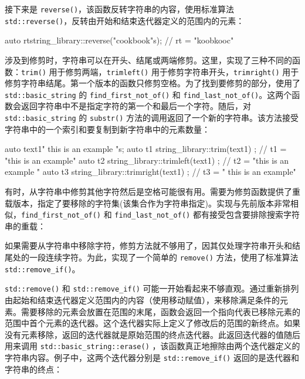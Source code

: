 接下来是 \verb|reverse()|，该函数反转字符串的内容，使用标准算法 \verb|std::reverse()|，反转由开始和结束迭代器定义的范围内的元素：

\begin{cpp}
auto rt{string_library::reverse("cookbook"s)}; // rt = "koobkooc"
\end{cpp}

涉及到修剪时，字符串可以在开头、结尾或两端修剪。这里，实现了三种不同的函数：\verb|trim()| 用于修剪两端，\verb|trimleft()| 用于修剪字符串开头，\verb|trimright()| 用于修剪字符串结尾。第一个版本的函数只修剪空格。为了找到要修剪的部分，使用了 \verb|std::basic_string| 的 \verb|find_first_not_of()| 和 \verb|find_last_not_of()|。这两个函数会返回字符串中不是指定字符的第一个和最后一个字符。随后，对 \verb|std::basic_string| 的 \verb|substr()| 方法的调用返回了一个新的字符串。该方法接受字符串中的一个索引和要复制到新字符串中的元素数量：

\begin{cpp}
auto text1{"   this is an example   "s};
auto t1{ string_library::trim(text1) };
// t1 = "this is an example"
auto t2{ string_library::trimleft(text1) };
// t2 = "this is an example   "
auto t3{ string_library::trimright(text1) };
// t3 = "   this is an example"
\end{cpp}

有时，从字符串中修剪其他字符然后是空格可能很有用。需要为修剪函数提供了重载版本，指定了要移除的字符集(该集合作为字符串指定)。实现与先前版本非常相似，\verb|find_first_not_of()| 和 \verb|find_last_not_of()| 都有接受包含要排除搜索字符串的重载：


如果需要从字符串中移除字符，修剪方法就不够用了，因其仅处理字符串开头和结尾处的一段连续字符。为此，实现了一个简单的 \verb|remove()| 方法，使用了标准算法 \verb|std::remove_if()|。

\verb|std::remove()| 和 \verb|std::remove_if()| 可能一开始看起来不够直观。通过重新排列由起始和结束迭代器定义范围内的内容（使用移动赋值），来移除满足条件的元素。需要移除的元素会放置在范围的末尾，函数会返回一个指向代表已移除元素的范围中首个元素的迭代器。这个迭代器实际上定义了修改后的范围的新终点。如果没有元素移除，返回的迭代器就是原始范围的终点迭代器。此返回迭代器的值随后用来调用 \verb|std::basic_string::erase()| ，该函数真正地擦除由两个迭代器定义的字符串内容。例子中，这两个迭代器分别是 \verb|std::remove_if()| 返回的是迭代器和字符串的终点：

